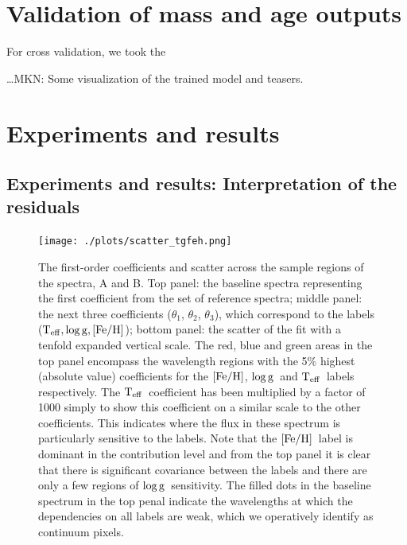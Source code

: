 \documentclass[12pt, preprint]{aastex}
\newcommand{\teff}{\mbox{$\rm T_{eff}$}}
\newcommand{\feh}{\mbox{$\rm [Fe/H]$}}
\newcommand{\logg}{\mbox{$\rm \log g$}}
\begin{document}
\section{Validation of mass and age outputs}

For cross validation, we took the 




\ldots MKN: Some visualization of the trained model and teasers.

\section{Experiments and results}

\subsection{Experiments and results: Interpretation of the residuals}

\begin{figure}[p!]
\centering
    \texttt{[image: ./plots/scatter\_tgfeh.png]}
  \caption{The first-order coefficients and scatter across the sample regions of the spectra, A and B. Top panel: the baseline spectra representing the first coefficient from the set of reference spectra; middle panel: the next three coefficients ($\theta_1$, $\theta_2$, $\theta_3$),  which correspond to the labels ($\teff, \logg, \feh$); bottom panel: the scatter of the fit with a tenfold expanded vertical scale. The red, blue and green areas in the top panel encompass the wavelength regions with the 5\% highest (absolute value) coefficients for the \feh, \logg\  and \teff\ labels respectively. The \teff\ coefficient has been multiplied by a factor of 1000 simply to show this coefficient on a similar scale to the other coefficients. This indicates where the flux in these spectrum is particularly sensitive to the labels.  Note that the \feh\ label is dominant in the contribution level and from the top panel it is clear that there is significant covariance between the labels and there are only a few regions of \logg\ sensitivity. The filled dots in the baseline spectrum in the top penal indicate the wavelengths at which the dependencies on all labels are weak, which we operatively identify as continuum pixels.}
\label{fig:validation}
\end{figure}
\end{document}
